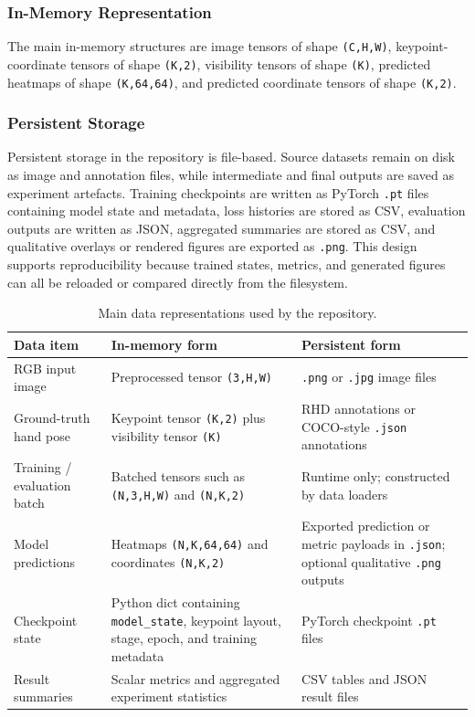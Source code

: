 ﻿\documentclass[11pt,a4paper]{article}
\begin{document}
\subsubsection*{In-Memory Representation}

The main in-memory structures are image tensors of shape \texttt{(C,H,W)},
keypoint-coordinate tensors of shape \texttt{(K,2)}, visibility tensors of
shape \texttt{(K)}, predicted heatmaps of shape \texttt{(K,64,64)}, and
predicted coordinate tensors of shape \texttt{(K,2)}.

\subsubsection*{Persistent Storage}

Persistent storage in the repository is file-based. Source datasets remain on
disk as image and annotation files, while intermediate and final outputs are
saved as experiment artefacts. Training checkpoints are written as PyTorch
\texttt{.pt} files containing model state and metadata, loss histories are
stored as CSV, evaluation outputs are written as JSON, aggregated summaries are
stored as CSV, and qualitative overlays or rendered figures are exported as
\texttt{.png}.
This design supports reproducibility because trained states, metrics, and
generated figures can all be reloaded or compared directly from the
filesystem.

\medskip

\begin{table}[htbp]
\centering
\small
\begin{tabular}{|p{}|p{}|p{}|}
\hline
\textbf{Data item} & \textbf{In-memory form} & \textbf{Persistent form} \\
\hline
RGB input image & Preprocessed tensor \texttt{(3,H,W)} & \texttt{.png} or \texttt{.jpg} image files \\
\hline
Ground-truth hand pose & Keypoint tensor \texttt{(K,2)} plus visibility tensor \texttt{(K)} & RHD annotations or COCO-style \texttt{.json} annotations \\
\hline
Training / evaluation batch & Batched tensors such as \texttt{(N,3,H,W)} and \texttt{(N,K,2)} & Runtime only; constructed by data loaders \\
\hline
Model predictions & Heatmaps \texttt{(N,K,64,64)} and coordinates \texttt{(N,K,2)} & Exported prediction or metric payloads in \texttt{.json}; optional qualitative \texttt{.png} outputs \\
\hline
Checkpoint state & Python dict containing \texttt{model\_state}, keypoint layout, stage, epoch, and training metadata & PyTorch checkpoint \texttt{.pt} files \\
\hline
Result summaries & Scalar metrics and aggregated experiment statistics & CSV tables and JSON result files \\
\hline
\end{tabular}
\caption{Main data representations used by the repository.}
\label{tab:data-representations}
\end{table}
\end{document}
